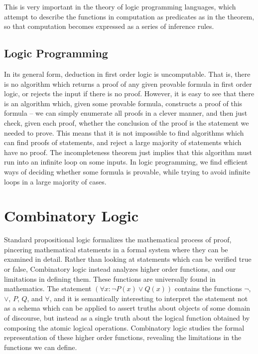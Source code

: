 This is very important in the theory of logic programming languages, which attempt to describe the functions in computation as predicates as in the theorem, so that computation becomes expressed as a series of inference rules.

\section{Logic Programming}

In its general form, deduction in first order logic is uncomputable. That is, there is no algorithm which returns a proof of any given provable formula in first order logic, or rejects the input if there is no proof. However, it is easy to see that there is an algorithm which, given some provable formula, constructs a proof of this formula -- we can simply enumerate all proofs in a clever manner, and then just check, given each proof, whether the conclusion of the proof is the statement we needed to prove. This means that it is not impossible to find algorithms which can find proofs of statements, and reject a large majority of statements which have no proof. The incompleteness theorem just implies that this algorithm must run into an infinite loop on some inputs. In logic programming, we find efficient ways of deciding whether some formula is provable, while trying to avoid infinite loops in a large majority of cases.


\chapter{Combinatory Logic}

Standard propositional logic formalizes the mathematical process of proof, pincering mathematical statements in a formal system where they can be examined in detail. Rather than looking at statements which can be verified true or false, Combinatory logic instead analyzes higher order functions, and our limitations in defining them. These functions are universally found in mathematics. The statement $(\forall x: \neg P(x) \vee Q(x))$ contains the functions $\neg$, $\vee$, $P$, $Q$, and $\forall$, and it is semantically interesting to interpret the statement not as a schema which can be applied to assert truths about objects of some domain of discourse, but instead as a single truth about the logical function obtained by composing the atomic logical operations. Combinatory logic studies the formal representation of these higher order functions, revealing the limitations in the functions we can define.


